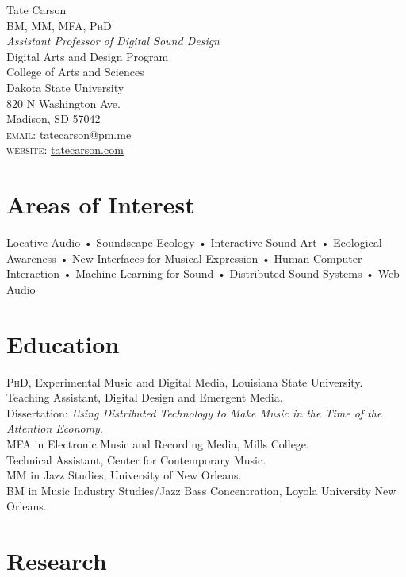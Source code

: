 \documentclass[10pt, a4paper]{article}
\newcommand{\years}[1]{\marginnote{\scriptsize #1}}
\begin{document}
{\Huge Tate Carson}\\[0.1cm]
\textsc{BM, MM, MFA, PhD}\\[0.9cm]
\emph{Assistant Professor of Digital Sound Design}\\
Digital Arts and Design Program \\
College of Arts and Sciences\\
Dakota State University \\ 
820 N Washington Ave.\\
Madison, SD 57042 \\[.2cm]

\textsc{email}: \href{mailto:tatecarson@pm.me}{tatecarson@pm.me}\\
\textsc{website}: \href{https://tatecarson.com}{tatecarson.com}


\section*{Areas of Interest}
Locative Audio • Soundscape Ecology • Interactive Sound Art • Ecological Awareness • New Interfaces for Musical Expression • Human-Computer Interaction • Machine Learning for Sound • Distributed Sound Systems • Web Audio



\section*{Education}
\noindent
\years{2021}\textsc{PhD}, Experimental Music and Digital Media, Louisiana State University.\\
Teaching Assistant, Digital Design and Emergent Media. \\
Dissertation: \emph{Using Distributed Technology to Make Music in the Time of the Attention Economy}.\\
\years{2017}\textsc{MFA} in Electronic Music and Recording Media, Mills College.\\
Technical Assistant, Center for Contemporary Music.\\
\years{2011}\textsc{MM} in Jazz Studies, University of New Orleans.\\
\years{2009}\textsc{BM} in Music Industry Studies/Jazz Bass Concentration, Loyola University New Orleans.

\section*{Research}
\end{document}
